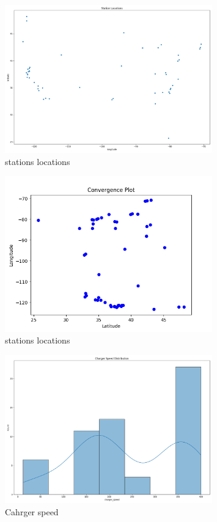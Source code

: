 \documentclass[12pt]{report}
\begin{document}
\vspace{1cm} %

\begin{figure}[h!]
    \centering
    \includegraphics[width=0.8\textwidth]{Figures/station_locations.png}
    \caption{stations locations}
    \label{fig:OOriginal_map}
\end{figure}

\begin{figure}[h!]
    \centering
    \includegraphics[width=0.8\textwidth]{Figures/convergence_plot.png}
    \caption{stations locations}
    \label{fig:Original_map}
\end{figure}

\vspace{1cm} %

\begin{figure}[h!]
    \centering
    \includegraphics[width=0.8\textwidth]{Figures/charger_speed.png}
    \caption{Cahrger speed}
    \label{fig:Cahrger speed}
\end{figure}
\end{document}

